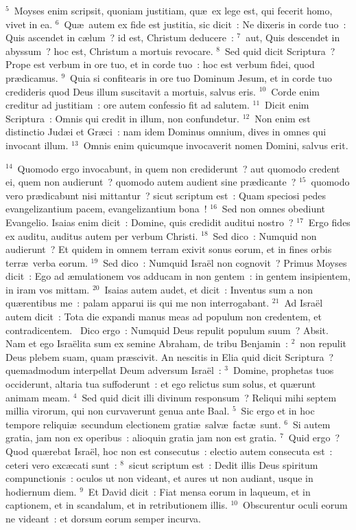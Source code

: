 ${}^{5}$~Moyses enim scripsit, quoniam justitiam, qu\ae\ ex lege est, qui fecerit homo, vivet in ea.
${}^{6}$~Qu\ae\ autem ex fide est justitia, sic dicit~: Ne dixeris in corde tuo~: Quis ascendet in c\ae lum~? id est, Christum deducere~:
${}^{7}$~aut, Quis descendet in abyssum~? hoc est, Christum a mortuis revocare.
${}^{8}$~Sed quid dicit Scriptura~? Prope est verbum in ore tuo, et in corde tuo~: hoc est verbum fidei, quod pr\ae dicamus.
${}^{9}$~Quia si confitearis in ore tuo Dominum Jesum, et in corde tuo credideris quod Deus illum suscitavit a mortuis, salvus eris.
${}^{10}$~Corde enim creditur ad justitiam~: ore autem confessio fit ad salutem.
${}^{11}$~Dicit enim Scriptura~: Omnis qui credit in illum, non confundetur.
${}^{12}$~Non enim est distinctio Jud\ae i et Gr\ae ci~: nam idem Dominus omnium, dives in omnes qui invocant illum.
${}^{13}$~Omnis enim quicumque invocaverit nomen Domini, salvus erit.


${}^{14}$~Quomodo ergo invocabunt, in quem non crediderunt~? aut quomodo credent ei, quem non audierunt~? quomodo autem audient sine pr\ae dicante~?
${}^{15}$~quomodo vero pr\ae dicabunt nisi mittantur~? sicut scriptum est~: Quam speciosi pedes evangelizantium pacem, evangelizantium bona~!
${}^{16}$~Sed non omnes obediunt Evangelio. Isaias enim dicit~: Domine, quis credidit auditui nostro~?
${}^{17}$~Ergo fides ex auditu, auditus autem per verbum Christi.
${}^{18}$~Sed dico~: Numquid non audierunt~? Et quidem in omnem terram exivit sonus eorum, et in fines orbis terr\ae\ verba eorum.
${}^{19}$~Sed dico~: Numquid Isra\"el non cognovit~? Primus Moyses dicit~: Ego ad \ae mulationem vos adducam in non gentem~: in gentem insipientem, in iram vos mittam.
${}^{20}$~Isaias autem audet, et dicit~: Inventus sum a non qu\ae rentibus me~: palam apparui iis qui me non interrogabant.
${}^{21}$~Ad Isra\"el autem dicit~: Tota die expandi manus meas ad populum non credentem, et contradicentem.
~Dico ergo~: Numquid Deus repulit populum suum~? Absit. Nam et ego Isra\"elita sum ex semine Abraham, de tribu Benjamin~:
${}^{2}$~non repulit Deus plebem suam, quam pr\ae scivit. An nescitis in Elia quid dicit Scriptura~? quemadmodum interpellat Deum adversum Isra\"el~:
${}^{3}$~Domine, prophetas tuos occiderunt, altaria tua suffoderunt~: et ego relictus sum solus, et qu\ae runt animam meam.
${}^{4}$~Sed quid dicit illi divinum responsum~? Reliqui mihi septem millia virorum, qui non curvaverunt genua ante Baal.
${}^{5}$~Sic ergo et in hoc tempore reliqui\ae\ secundum electionem grati\ae\ salv\ae\ fact\ae\ sunt.
${}^{6}$~Si autem gratia, jam non ex operibus~: alioquin gratia jam non est gratia.
${}^{7}$~Quid ergo~? Quod qu\ae rebat Isra\"el, hoc non est consecutus~: electio autem consecuta est~: ceteri vero exc\ae cati sunt~:
${}^{8}$~sicut scriptum est~: Dedit illis Deus spiritum compunctionis~: oculos ut non videant, et aures ut non audiant, usque in hodiernum diem.
${}^{9}$~Et David dicit~: Fiat mensa eorum in laqueum, et in captionem, et in scandalum, et in retributionem illis.
${}^{10}$~Obscurentur oculi eorum ne videant~: et dorsum eorum semper incurva.


